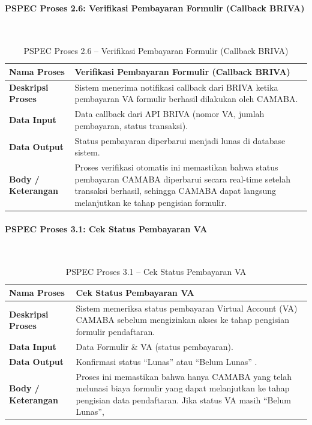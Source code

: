 \paragraph{PSPEC Proses 2.6: Verifikasi Pembayaran Formulir (Callback BRIVA)}~\\
\begin{longtable}{|p{}|p{}|}
	\caption{PSPEC Proses 2.6 -- Verifikasi Pembayaran Formulir (Callback BRIVA)}
	\label{table:3.pspec26}\\
	\hline
	\textbf{Nama Proses} & Verifikasi Pembayaran Formulir (Callback BRIVA) \\
	\hline
	\textbf{Deskripsi Proses} & Sistem menerima notifikasi callback dari BRIVA ketika pembayaran VA formulir berhasil dilakukan oleh CAMABA. \\
	\hline
	\textbf{Data Input} & Data callback dari API BRIVA (nomor VA, jumlah pembayaran, status transaksi). \\
	\hline
	\textbf{Data Output} & Status pembayaran diperbarui menjadi lunas di database sistem. \\
	\hline
	\textbf{Body / Keterangan} & Proses verifikasi otomatis ini memastikan bahwa status pembayaran CAMABA diperbarui secara real-time setelah transaksi berhasil, sehingga CAMABA dapat langsung melanjutkan ke tahap pengisian formulir. \\
	\hline
\end{longtable}

\paragraph{PSPEC Proses 3.1: Cek Status Pembayaran VA}~\\
\begin{longtable}{|p{}|p{}|}
	\caption{PSPEC Proses 3.1 -- Cek Status Pembayaran VA}
	\label{table:3.pspec31}\\
	\hline
	\textbf{Nama Proses} & Cek Status Pembayaran VA \\
	\hline
	\textbf{Deskripsi Proses} & Sistem memeriksa status pembayaran Virtual Account (VA) CAMABA sebelum mengizinkan akses ke tahap pengisian formulir pendaftaran. \\
	\hline
	\textbf{Data Input} & Data Formulir \& VA (status pembayaran). \\
	\hline
	\textbf{Data Output} & Konfirmasi status “Lunas” atau “Belum Lunas” . \\
	\hline
	\textbf{Body / Keterangan} & Proses ini memastikan bahwa hanya CAMABA yang telah melunasi biaya formulir yang dapat melanjutkan ke tahap pengisian data pendaftaran. Jika status VA masih “Belum Lunas”, \\
	\hline
\end{longtable}

